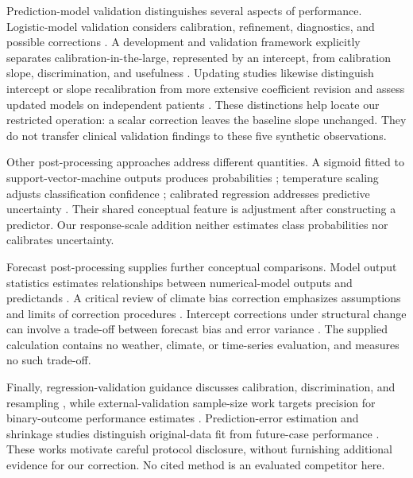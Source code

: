 \documentclass[11pt]{article}
\begin{document}
Prediction-model validation distinguishes several aspects of performance. Logistic-model validation considers calibration, refinement, diagnostics, and possible corrections \cite{Miller1991ValidationTechniques}. A development and validation framework explicitly separates calibration-in-the-large, represented by an intercept, from calibration slope, discrimination, and usefulness \cite{Steyerberg2014TowardsBetter}. Updating studies likewise distinguish intercept or slope recalibration from more extensive coefficient revision and assess updated models on independent patients \cite{Steyerberg2004ValidationUpdating}. These distinctions help locate our restricted operation: a scalar correction leaves the baseline slope unchanged. They do not transfer clinical validation findings to these five synthetic observations.

Other post-processing approaches address different quantities. A sigmoid fitted to support-vector-machine outputs produces probabilities \cite{Platt1999ProbabilisticOutputs}; temperature scaling adjusts classification confidence \cite{Guo2017CalibrationModern}; calibrated regression addresses predictive uncertainty \cite{Kuleshov2018AccurateUncertainties}. Their shared conceptual feature is adjustment after constructing a predictor. Our response-scale addition neither estimates class probabilities nor calibrates uncertainty.

Forecast post-processing supplies further conceptual comparisons. Model output statistics estimates relationships between numerical-model outputs and predictands \cite{Glahn1972UseModel}. A critical review of climate bias correction emphasizes assumptions and limits of correction procedures \cite{Maraun2016BiasCorrecting}. Intercept corrections under structural change can involve a trade-off between forecast bias and error variance \cite{Clements1996InterceptCorrections}. The supplied calculation contains no weather, climate, or time-series evaluation, and measures no such trade-off.

Finally, regression-validation guidance discusses calibration, discrimination, and resampling \cite{Harrell1996MultivariablePrognostic}, while external-validation sample-size work targets precision for binary-outcome performance estimates \cite{Riley2021MinimumSample}. Prediction-error estimation and shrinkage studies distinguish original-data fit from future-case performance \cite{Efron1983EstimatingError,Copas1983RegressionPrediction}. These works motivate careful protocol disclosure, without furnishing additional evidence for our correction. No cited method is an evaluated competitor here.
\end{document}
